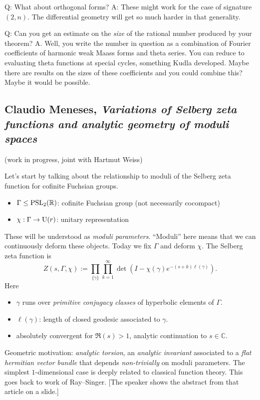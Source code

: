 \documentclass[reqno]{amsart} 
\numberwithin{theorem}{section}
\numberwithin{equation}{section}
\begin{document}
Q: What about orthogonal forms?  A: These might work for the case of signature $(2, n)$.  The differential geometry will get so much harder in that generality.

Q: Can you get an estimate on the \emph{size} of the rational number produced by your theorem?  A.  Well, you write the number in question as a combination of Fourier coefficients of harmonic weak Maass forms and theta series.  You can reduce to evaluating theta functions at special cycles, something Kudla developed.  Maybe there are results on the sizes of these coefficients and you could combine this?  Maybe it would be possible.


\subsection{Claudio Meneses, \emph{Variations of Selberg zeta functions and analytic geometry of moduli spaces}}

(work in progress, joint with Hartmut Weiss)

Let's start by talking about the relationship to moduli of the Selberg zeta function for cofinite Fuchsian groups.
\begin{itemize}
\item $\Gamma \leq \operatorname{PSL}_2(\mathbb{R})$: cofinite Fuchsian group (not necessarily cocompact)
\item $\chi : \Gamma \rightarrow \operatorname{U}(r)$: unitary representation
\end{itemize}
These will be understood as \emph{moduli parameters}.  ``Moduli'' here means that we can continuously deform these objects.  Today we fix $\Gamma$ and deform $\chi$.  The Selberg  zeta function is
\begin{equation*}
  Z(s, \Gamma, \chi) := \prod_{\{\gamma\}} \prod_{k = 1}^\infty \det \left( I - \chi(\gamma) e^{-(s + k) \ell(\gamma)} \right).
\end{equation*}
Here
\begin{itemize}
\item $\gamma$ runs over \emph{primitive conjugacy classes} of hyperbolic elements of $\Gamma$.
\item $\ell(\gamma)$: length of closed geodesic associated to $\gamma$.
\item absolutely convergent for $\Re(s) > 1$, analytic continuation to $s \in \mathbb{C}$.
\end{itemize}
Geometric motivation: \emph{analytic torsion}, an \emph{analytic invariant} associated to a \emph{flat hermitian vector bundle} that depends \emph{non-trivially} on moduli parameters.  The simplest $1$-dimensional case is deeply related to classical function theory.  This goes back to work of Ray--Singer.  [The speaker shows the abstract from that article on a slide.]
\end{document}
